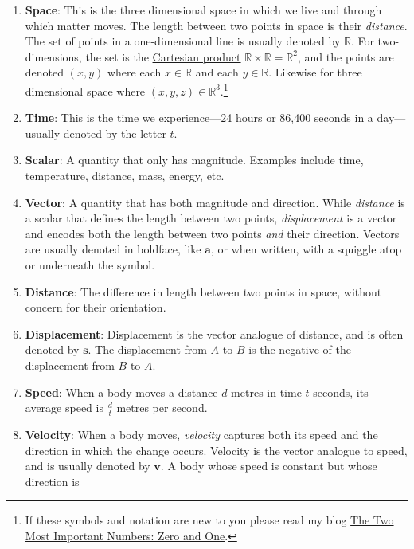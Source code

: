 \documentclass[
  a4paper,
]{article}
\begin{document}
\begin{enumerate}
\item
  \textbf{Space}: This is the three dimensional space in which we live
  and through which matter moves. The length between two points in space
  is their \emph{distance}. The set of points in a one-dimensional line
  is usually denoted by \(\mathbb{R}\). For two-dimensions, the set is
  the \href{https://en.wikipedia.org/wiki/Cartesian_product}{Cartesian
  product} \(\mathbb{R} \times \mathbb{R} = \mathbb{R}^2\), and the
  points are denoted \((x, y)\) where each \(x \in \mathbb{R}\) and each
  \(y \in \mathbb{R}\). Likewise for three dimensional space where
  \((x, y, z) \in \mathbb{R}^3\).\footnote{If these symbols and notation
    are new to you please read my blog
    \href{https://swanlotus.netlify.app/blogs/the-two-most-important-numbers-zero-and-one}{The
    Two Most Important Numbers: Zero and One}.}
\item
  \textbf{Time}: This is the time we experience---24 hours or 86,400
  seconds in a day---usually denoted by the letter \(t\).
\item
  \textbf{Scalar}: A quantity that only has magnitude. Examples include
  time, temperature, distance, mass, energy, etc.
\item
  \textbf{Vector}: A quantity that has both magnitude and direction.
  While \emph{distance} is a scalar that defines the length between two
  points, \emph{displacement} is a vector and encodes both the length
  between two points \emph{and} their direction. Vectors are usually
  denoted in boldface, like \(\mathbf{a}\), or when written, with a
  squiggle atop or underneath the symbol.
\item
  \textbf{Distance}: The difference in length between two points in
  space, without concern for their orientation.
\item
  \textbf{Displacement}: Displacement is the vector analogue of
  distance, and is often denoted by \(\mathbf{s}\). The displacement
  from \(A\) to \(B\) is the negative of the displacement from \(B\) to
  \(A\).
\item
  \textbf{Speed}: When a body moves a distance \(d\) metres in time
  \(t\) seconds, its average speed is \(\frac{d}{t}\) metres per second.
\item
  \textbf{Velocity}: When a body moves, \emph{velocity} captures both
  its speed and the direction in which the change occurs. Velocity is
  the vector analogue to speed, and is usually denoted by
  \(\mathbf{v}\). A body whose speed is constant but whose direction is

\end{enumerate}
\end{document}
